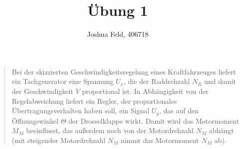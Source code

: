 \documentclass{exercise}
\title{Übung 1}
\author{Joshua Feld, 406718}
\begin{document}
	\maketitle


	\section{}

	\begin{quote}
		Bei der skizzierten Geschwindigkeitsregelung eines Kraftfahrzeuges liefert ein Tachgenerator eine Spannung \(U_x\), die der Raddrehzahl \(N_R\) und damit der Geschwindigkeit \(V\) proportional ist.
		In Abhängigkeit von der Regelabweichung liefert ein Regler, der proportionales Übertragungsverhalten haben soll, ein Signal \(U_y\), das auf den Öffnungswinkel \(\Theta\) der Drosselklappe wirkt.
		Damit wird das Motormoment \(M_M\) beeinflusst, das außerdem noch von der Motordrehzahl \(N_M\) abhängt (mit steigender Motordrehzahl \(N_M\) nimmt das Motormoment \(N_M\) ab).


\end{quote}
\end{document}
